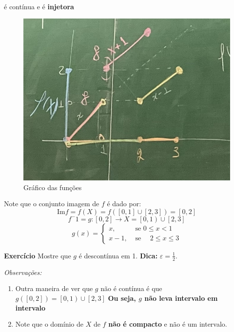 \documentclass[12pt]{article}
\begin{document}
    é contínua e é \textbf{injetora}
    \begin{figure}[H]
        \centering
        \includegraphics[scale = 0.5]{IMG_1438.jpeg}
        \caption{Gráfico das funções}
        \label{fig:graf}
    \end{figure}
    Note que o conjunto imagem de $f$ é dado por:
    \begin{equation*}
        \text{Im} f = f(X) = f\left(\left[0,1\right] \cup \left[2, 3\right]\right) = \left[0,2\right]
    \end{equation*}
    \begin{equation*}
        f^-1 = g:\left[0, 2\right] \to X = \left[0,1\right) \cup \left[2,3\right]
    \end{equation*}
    \begin{equation*}
        g(x)= 
        \begin{cases}
        x, & \text{ se } 0 \leq x <1 \\
        x-1, & \text{ se }\quad 2 \leq x \leq 3
        \end{cases}
    \end{equation*}

    \textbf{Exercício} Mostre que $g$ é descontínua em 1. \textbf{Dica:} $\varepsilon = \frac{1}{2}$. 

    \textit{Observações:}
    \begin{enumerate}
        \item Outra maneira de ver que $g$ não é contínua é que $g\left(\left[ 0,2 \right]\right) = \left[0,1\right)\cup\left[2,3\right]$
        \textbf{Ou seja, $g$ não leva intervalo em intervalo}

        \item Note que o domínio de $X$ de $f$ \textbf{não é compacto} e não é um intervalo.
    \end{enumerate}
\end{document}
